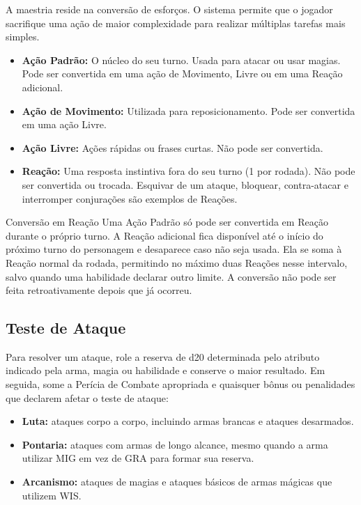 A maestria reside na conversão de esforços. O sistema permite que o jogador sacrifique uma ação de maior complexidade para realizar múltiplas tarefas mais simples.

\begin{itemize}
    \item \textbf{Ação Padrão:} O núcleo do seu turno. Usada para atacar ou usar magias. Pode ser convertida em uma ação de Movimento, Livre ou em uma Reação adicional.
    \item \textbf{Ação de Movimento:} Utilizada para reposicionamento. Pode ser convertida em uma ação Livre.
    \item \textbf{Ação Livre:} Ações rápidas ou frases curtas. Não pode ser convertida.
    \item \textbf{Reação:} Uma resposta instintiva fora do seu turno (1 por rodada). Não pode ser convertida ou trocada. Esquivar de um ataque, bloquear, contra-atacar e interromper conjurações são exemplos de Reações.
\end{itemize}

\begin{rpgboxtips}{Conversão em Reação}
Uma Ação Padrão só pode ser convertida em Reação durante o próprio turno. A Reação adicional fica disponível até o início do próximo turno do personagem e desaparece caso não seja usada. Ela se soma à Reação normal da rodada, permitindo no máximo duas Reações nesse intervalo, salvo quando uma habilidade declarar outro limite. A conversão não pode ser feita retroativamente depois que já ocorreu.
\end{rpgboxtips}


\subsection*{Teste de Ataque}

Para resolver um ataque, role a reserva de d20 determinada pelo atributo indicado pela arma, magia ou habilidade e conserve o maior resultado. Em seguida, some a Perícia de Combate apropriada e quaisquer bônus ou penalidades que declarem afetar o teste de ataque:

\begin{itemize}
    \item \textbf{Luta:} ataques corpo a corpo, incluindo armas brancas e ataques desarmados.
    \item \textbf{Pontaria:} ataques com armas de longo alcance, mesmo quando a arma utilizar MIG em vez de GRA para formar sua reserva.
    \item \textbf{Arcanismo:} ataques de magias e ataques básicos de armas mágicas que utilizem WIS.
\end{itemize}

